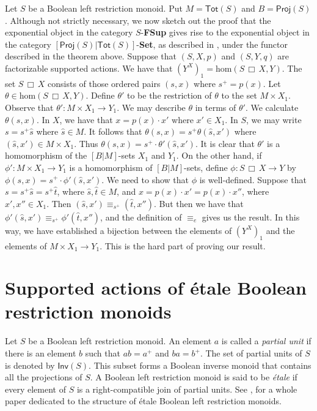 \documentclass[a4paper]{amsart}
\begin{document}
Let $S$ be a Boolean left restriction monoid.
Put $M = \mathsf{Tot}(S)$ and $B = \mathsf{Proj}(S)$.
Although not strictly necessary, we now sketch out the proof that the exponential object 
in the category $S$-{\bf FSup} gives rise to the exponential object in the category $[\mathsf{Proj}(S)|\mathsf{Tot}(S)]$-{\bf Set},
as described in \cite[Proposition 7.11]{G2024},
under the functor described in the theorem above.
Suppose that $(S,X,p)$ and $(S,Y,q)$ are factorizable supported actions.
We have that $(Y^{X})_{1} = \mbox{hom}(S \, \Box \, X,Y)$.
The set $S \,\Box \, X$ consists of those ordered pairs $(s,x)$ where $s^{+} = p(x)$.
Let $\theta \in \mbox{hom}(S \, \Box \, X,Y)$.
Define $\theta'$ to be the restriction of $\theta$ to the set $M \times X_{1}$.
Observe that $\theta' \colon M \times X_{1} \rightarrow Y_{1}$.
We may describe $\theta$ in terms of $\theta'$.
We calculate $\theta (s,x)$.
In $X$, we have that $x = p(x) \cdot x'$ where $x' \in X_{1}$.
In $S$, we may write $s = s^{+}\hat{s}$ where $\hat{s} \in M$.
It follows that $\theta (s,x) = s^{+} \theta (\hat{s},x')$ where $(\hat{s}, x') \in M \times X_{1}$.
Thus $\theta (s,x) = s^{+} \cdot \theta' (\hat{s}, x')$.
It is clear that $\theta'$ is a homomorphism of the $[B|M]$-sets $X_{1}$ and $Y_{1}$.
On the other hand, if $\phi' \colon M \times X_{1} \rightarrow Y_{1}$ is a homomorphism of $[B|M]$-sets,
define $\phi \colon S \, \Box \, X \rightarrow Y$
by $\phi (s,x) = s^{+} \cdot \phi' (\hat{s}, x')$. 
We need to show that $\phi$ is well-defined.
Suppose that $s = s^{+}\hat{s} = s^{+}\hat{t}$, where $\hat{s}, \hat{t} \in M$,
and $x = p(x) \cdot x' = p(x) \cdot x''$, where $x',x'' \in X_{1}$. 
Then $(\hat{s},x') \equiv_{s^{+}} (\hat{t}, x'')$.
But then we have that $\phi' (\hat{s},x') \equiv_{s^{+}} \phi' (\hat{t}, x'')$,
and the definition of $\equiv_{e}$ gives us the result.
In this way, we have established a bijection between the elements of $(Y^{X})_{1}$
and the elements of $M \times X_{1} \rightarrow Y_{1}$. 
This is the hard part of proving our result.

  


\section{Supported actions of \'etale Boolean restriction monoids}

Let $S$ be a Boolean left restriction monoid.
An element $a$ is called a {\em partial unit} if there is an element $b$ such that
$ab = a^{+}$ and $ba = b^{+}$.
The set of partial units of $S$ is denoted by $\mathsf{Inv}(S)$.
This subset forms a Boolean inverse monoid that contains all the projections of $S$.
A Boolean left restriction monoid is said to be  {\em \'etale} if every element of $S$
is a right-compatible join of partial units.
See \cite{L2025}, for a whole paper dedicated to the structure of \'etale Boolean left restriction monoids.
\end{document}
